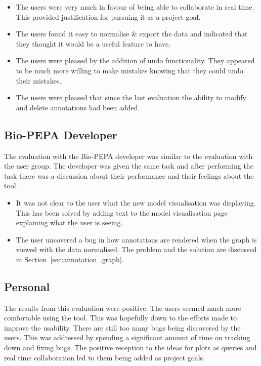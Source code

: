 \begin{itemize}
\item The users were very much in favour of being able to collaborate in real time. This provided justification for pursuing it as a project goal.
\item The users found it easy to normalise \& export the data and indicated that they thought it would be a useful feature to have.
\item The users were pleased by the addition of undo functionality.  They appeared to be much more willing to make mistakes knowing that they could undo their mistakes.
\item The users were pleased that since the last evaluation the ability to modify and delete annotations had been added.
\end{itemize}

\subsection{Bio-PEPA Developer}

The evaluation with the Bio-PEPA developer was similar to the evaluation with the user group.  The developer was given the same task and after performing the task there was a discussion about their performance and their feelings about the tool.

\begin{itemize}
\item It was not clear to the user what the new model visualisation was displaying.  This has been solved by adding text to the model visualisation page explaining what the user is seeing.
\item The user uncovered a bug in how annotations are rendered when the graph is viewed with the data normalised.  The problem and the solution are discussed in Section~\ref{sec:annotation_graph}.
\end{itemize}

\subsection{Personal}

The results from this evaluation were positive.  The users seemed much more comfortable using the tool.  This was hopefully down to the efforts made to improve the usability.  There are still too many bugs being discovered by the users.  This was addressed by spending a significant amount of time on tracking down and fixing bugs.  The positive reception to the ideas for plots as queries and real time collaboration led to them being added as project goals.

